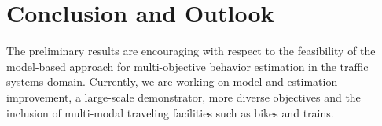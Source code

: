 \documentclass[conference]{../cls/IEEEtran}
\begin{document}
\section{Conclusion and Outlook}

The preliminary results are encouraging with respect to the feasibility of the model-based approach for multi-objective behavior estimation in the traffic systems domain. Currently, we are working on model and estimation improvement, a large-scale demonstrator, more diverse objectives and the inclusion of multi-modal traveling facilities such as bikes and trains.



\end{document}
